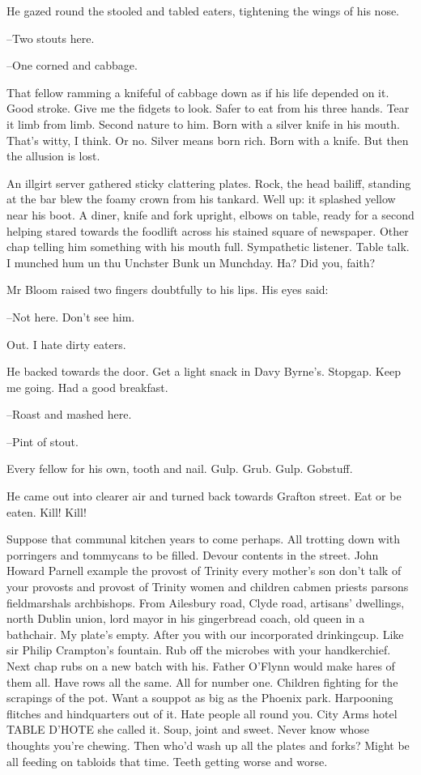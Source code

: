 He gazed round the stooled and tabled eaters,
tightening the wings of
his nose.

--Two stouts here.

--One corned and cabbage.

That fellow ramming a knifeful of cabbage down as if his life
depended on it.
Good stroke.
Give me the fidgets to look.
Safer to eat
from his three hands.
Tear it limb from limb.
Second nature to him.
Born
with a silver knife in his mouth.
That's witty,
I think.
Or no.
Silver
means born rich.
Born with a knife.
But then the allusion is lost.

An illgirt server gathered sticky clattering plates.
Rock,
the head
bailiff,
standing at the bar blew the foamy crown from his tankard.
Well
up:
it splashed yellow near his boot.
A diner,
knife and fork upright,
elbows on table,
ready for a second helping stared towards the foodlift
across his stained square of newspaper.
Other chap telling him something
with his mouth full.
Sympathetic listener.
Table talk.
I munched hum un
thu Unchster Bunk un Munchday.
Ha?
Did you,
faith?

Mr Bloom raised two fingers doubtfully to his lips.
His eyes said:

--Not here.
Don't see him.

Out.
I hate dirty eaters.

He backed towards the door.
Get a light snack in Davy Byrne's.
Stopgap.
Keep me going.
Had a good breakfast.

--Roast and mashed here.

--Pint of stout.

Every fellow for his own,
tooth and nail.
Gulp.
Grub.
Gulp.
Gobstuff.

He came out into clearer air and turned back towards Grafton street.
Eat or be eaten.
Kill!
Kill!

Suppose that communal kitchen years to come perhaps.
All trotting
down with porringers and tommycans to be filled.
Devour contents in the
street.
John Howard Parnell example the provost of Trinity every mother's
son don't talk of your provosts and provost of Trinity women and children
cabmen priests parsons fieldmarshals archbishops.
From Ailesbury road,
Clyde road,
artisans' dwellings,
north Dublin union,
lord mayor in his
gingerbread coach,
old queen in a bathchair.
My plate's empty.
After you
with our incorporated drinkingcup.
Like sir Philip Crampton's fountain.
Rub off the microbes with your handkerchief.
Next chap rubs on a new
batch with his.
Father O'Flynn would make hares of them all.
Have rows
all the same.
All for number one.
Children fighting for the scrapings of
the pot.
Want a souppot as big as the Phoenix park.
Harpooning flitches
and hindquarters out of it.
Hate people all round you.
City Arms hotel
TABLE D'HOTE she called it.
Soup,
joint and sweet.
Never know whose
thoughts you're chewing.
Then who'd wash up all the plates and forks?
Might be all feeding on tabloids that time.
Teeth getting worse and worse.

